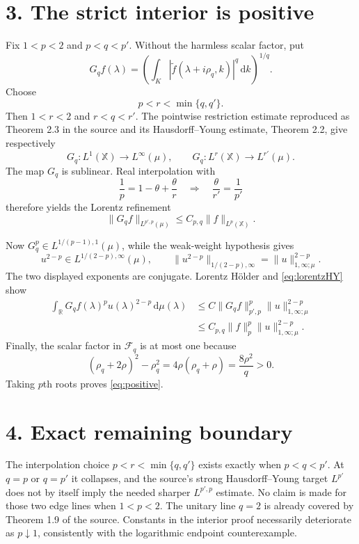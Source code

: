 \documentclass[10pt,a4paper]{article}
\newcommand{\X}{\mathbb X}
\newcommand{\R}{\mathbb R}
\newcommand{\dd}{\,\mathrm d}
\begin{document}
\section*{3. The strict interior is positive}

Fix $1<p<2$ and $p<q<p'$.  Without the harmless scalar factor, put
\[
 G_qf(\lambda)=
 \left(\int_K|\widetilde f(\lambda+i\rho_q,k)|^q\dd k\right)^{1/q}.
\]
Choose
\[
 p<r<\min\{q,q'\}.
\]
Then $1<r<2$ and $r<q<r'$.  The pointwise restriction estimate reproduced
as Theorem 2.3 in the source and its Hausdorff--Young estimate, Theorem 2.2,
give respectively
\[
 G_q:L^1(\X)\longrightarrow L^\infty(\mu),
 \qquad
 G_q:L^r(\X)\longrightarrow L^{r'}(\mu).
\]
The map $G_q$ is sublinear.  Real interpolation with
\[
 \frac1p=1-\theta+\frac\theta r
 \quad\Longrightarrow\quad
 \frac\theta{r'}=\frac1{p'}
\]
therefore yields the Lorentz refinement
\begin{equation}\label{eq:lorentzHY}
 \|G_qf\|_{L^{p',p}(\mu)}\le C_{p,q}\|f\|_{L^p(\X)}.
\end{equation}

Now $G_q^p\in L^{1/(p-1),1}(\mu)$, while the weak-weight hypothesis gives
\[
 u^{2-p}\in L^{1/(2-p),\infty}(\mu),
 \qquad
 \|u^{2-p}\|_{1/(2-p),\infty}
 =\|u\|_{1,\infty;\mu}^{2-p}.
\]
The two displayed exponents are conjugate.  Lorentz H\"older and
\eqref{eq:lorentzHY} show
\begin{align*}
 \int_\R G_qf(\lambda)^p u(\lambda)^{2-p}\dd\mu(\lambda)
 &\le C\|G_qf\|_{p',p}^p\|u\|_{1,\infty;\mu}^{2-p}\\
 &\le C_{p,q}\|f\|_p^p\|u\|_{1,\infty;\mu}^{2-p}.
\end{align*}
Finally, the scalar factor in $\mathcal F_q$ is at most one because
\[
 (\rho_q+2\rho)^2-\rho_q^2=4\rho(\rho_q+\rho)=\frac{8\rho^2}{q}>0.
\]
Taking $p$th roots proves \eqref{eq:positive}.

\section*{4. Exact remaining boundary}

The interpolation choice $p<r<\min\{q,q'\}$ exists exactly when
$p<q<p'$.  At $q=p$ or $q=p'$ it collapses, and the source's strong
Hausdorff--Young target $L^{p'}$ does not by itself imply the needed sharper
$L^{p',p}$ estimate.  No claim is made for those two edge lines when
$1<p<2$.  The unitary line $q=2$ is already covered by Theorem 1.9 of the
source.  Constants in the interior proof necessarily deteriorate as
$p\downarrow1$, consistently with the logarithmic endpoint counterexample.
\end{document}
